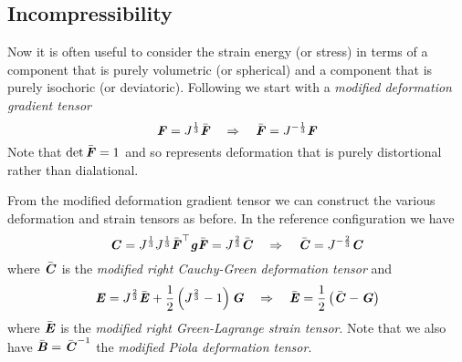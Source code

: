 \subsection{Incompressibility}

Now it is often useful to consider the strain energy (or stress) in terms of a
component that is purely volumetric (or spherical) and a component that is
purely isochoric (or deviatoric). Following  we start with
a \emph{modified deformation gradient
  tensor} \ie
\begin{equation}
  \tensor{F}=J^{\frac{1}{3}}\bar{\tensor{F}} \quad\Rightarrow\quad \bar{\tensor{F}} =J^{-\frac{1}{3}}\tensor{F}
  \label{eqn:modifiedDeformationGradientTensor}
\end{equation}
Note that $\det \bar{\boldsymbol{\mathit{F}}}=1$ and so represents deformation that is
purely distortional rather than dialational. 

From the modified deformation gradient tensor we can construct the various
deformation and strain tensors as before. In the reference configuration we
have
\begin{equation}
  \boldsymbol{\mathit{C}} = J^{\frac{1}{3}}J^{\frac{1}{3}} {\bar{\boldsymbol{\mathit{F}}}}^{ \top } \boldsymbol{\mathit{g}}\bar{\boldsymbol{\mathit{F}}}=J^{\frac{2}{3}}\bar{\boldsymbol{\mathit{C}}} \quad\Rightarrow\quad \bar{\boldsymbol{\mathit{C}}} =J^{-\frac{2}{3}}\boldsymbol{\mathit{C}}
\end{equation}
where $\bar{\boldsymbol{\mathit{C}}}$ is the \emph{modified right Cauchy-Green deformation
  tensor} and
\begin{equation}
  \boldsymbol{\mathit{E}} =
  J^{\frac{2}{3}}{\bar{\boldsymbol{\mathit{E}}}}+\dfrac{1}{2}\left( J^{\frac{2}{3}}-1 \right)\boldsymbol{\mathit{G}}
  \quad\Rightarrow\quad \bar{\boldsymbol{\mathit{E}}} = \dfrac{1}{2}\left( \bar{\boldsymbol{\mathit{C}}}-\boldsymbol{\mathit{G}} \right)
\end{equation}
where $\bar{\boldsymbol{\mathit{E}}}$ is the \emph{modified right Green-Lagrange strain
  tensor}. Note that we also have
$\bar{\boldsymbol{\mathit{B}}}={\bar{\boldsymbol{\mathit{C}}}}^{-1}$ the \emph{modified Piola
  deformation tensor}.

